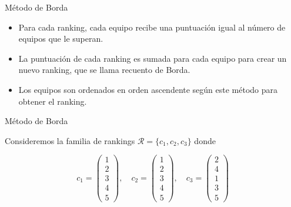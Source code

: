 \documentclass[10pt]{beamer}
\begin{document}
	\begin{frame}{Método de Borda}
		
		\begin{itemize}
			\item Para cada ranking, cada equipo recibe una puntuación igual al número de equipos que le superan.
			
			\item La puntuación de cada ranking es sumada para cada equipo para crear un nuevo ranking, que se llama recuento de Borda.
			
			\item Los equipos son ordenados en orden ascendente según este método para obtener el ranking.
		\end{itemize}
		
	\end{frame}
	
	\begin{frame}{Método de Borda}
		
		\begin{ejemplo}
			Consideremos la familia de rankings $\mathcal{R} = \{c_1, c_2, c_3\}$ donde
			
			\begin{equation*}
			c_1 = \left( \begin{array}{c}
			1\\
			2\\
			3\\
			4\\
			5
			\end{array} \right), \quad
			c_2 = \left( \begin{array}{c}
			1\\
			2\\
			3\\
			4\\
			5
			\end{array} \right), \quad
			c_3 = \left( \begin{array}{c}
			2\\
			4\\
			1\\
			3\\
			5
			\end{array} \right)
			\end{equation*}
			 
		\end{ejemplo}
	
		
	\end{frame}
	
\end{document}
